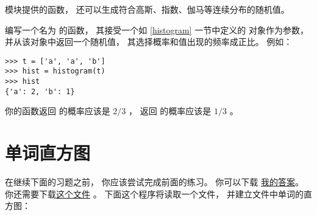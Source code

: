 
 模块提供的函数， 还可以生成符合高斯、指数、伽马等连续分布的随机值。  

\begin{exercise}


编写一个名为  的函数，  其接受一个如 \ref{histogram} 一节中定义的  对象作为参数，  并从该对象中返回一个随机值，  其选择概率和值出现的频率成正比。   例如：

\begin{lstlisting}
>>> t = ['a', 'a', 'b']
>>> hist = histogram(t)
>>> hist
{'a': 2, 'b': 1}
\end{lstlisting}


你的函数返回  的概率应该是 $2/3$ ， 返回  的概率应该是 $1/3$ 。  

\end{exercise}

\section{单词直方图}


在继续下面的习题之前， 你应该尝试完成前面的练习。  
你可以下载 \href{http://thinkpython2.com/code/analyze_book1.py}{我的答案}。  
你还需要下载\href{http://thinkpython2.com/code/emma.txt}{这个文件} 。  
下面这个程序将读取一个文件， 并建立文件中单词的直方图：

